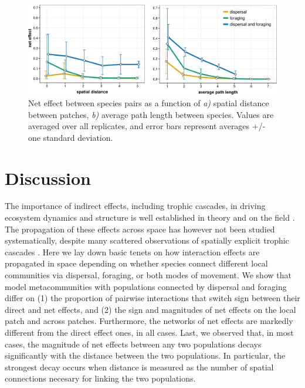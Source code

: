 \begin{figure}[ht]
\centering
\includegraphics[width=\textwidth,height=\textheight,keepaspectratio]{./Figures/chapter05/Fig_4.png}
\caption[Spatial decay of interaction effects]{\color{Gray}Net effect between species pairs as a function of \textit{a)} spatial distance between patches, \textit{b)} average path length between species. Values are averaged over all replicates, and error bars represent averages +/- one standard deviation.}\label{fig:fig5.4}
\end{figure}

\FloatBarrier

\section{Discussion}

The importance of indirect effects, including trophic cascades, in driving ecosystem dynamics and structure is well established in theory \citep{Abrams1992, Wootton2002, Gravel2010, Mayfield2017} and on the field \citep{Menge1995, Peacor1997, Moya-Larano2007, Barbosa2017, Trussell2017}. The propagation of these effects across space has however not been studied systematically, despite many scattered observations of spatially explicit trophic cascades \citep{Polis1997, Estes1998, Knight2005, Casini2012, Springer2018}. Here we lay down basic tenets on how interaction effects are propagated in space depending on whether species connect different local communities via dispersal, foraging, or both modes of movement. We show that model metacommunities with populations connected by dispersal and foraging differ on (1) the proportion of pairwise interactions that switch sign between their direct and net effects, and (2) the sign and magnitudes of net effects on the local patch and across patches. Furthermore, the networks of net effects are markedly different from the direct effect ones, in all cases. Last, we observed that, in most cases, the magnitude of net effects between any two populations decays significantly with the distance between the two populations. In particular, the strongest decay occurs when distance is measured as the number of spatial connections necesary for linking the two populations.


